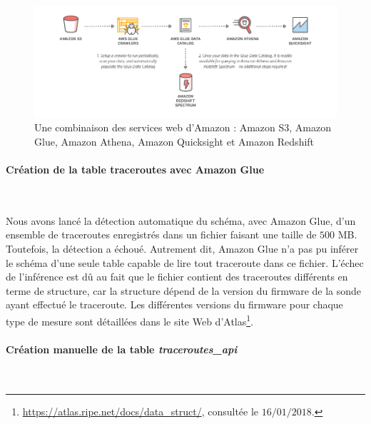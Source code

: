 \begin{figure}[h]
	\centering
	\captionsetup{justification=centering}
	\includegraphics[width=1\linewidth]{illustrations/glue_crawler}
	\caption{Une combinaison des services web d'Amazon : Amazon S3, Amazon Glue, Amazon Athena, Amazon Quicksight  et Amazon Redshift}
	\label{fig:gluecrawler}
\end{figure}


\paragraph{Création de la table traceroutes avec Amazon Glue}~

Nous avons lancé    la détection automatique du schéma, avec Amazon Glue, d'un ensemble de  traceroutes enregistrés dans un fichier faisant une taille de $500$ MB. Toutefois, la détection a échoué. Autrement dit, Amazon Glue n'a pas pu inférer le schéma d'une seule table capable de lire tout traceroute dans ce fichier.  L'échec de l'inférence est dû au fait que le fichier contient des traceroutes différents en terme de structure, car la structure dépend de la version du firmware de la sonde ayant effectué le traceroute. Les différentes versions du firmware  pour chaque type de mesure sont détaillées dans le site Web d'Atlas\footnote{\url{https://atlas.ripe.net/docs/data_struct/}, consultée le $16/01/2018$.}.
 
\paragraph{Création manuelle de la table \textit{traceroutes\_api}}~

